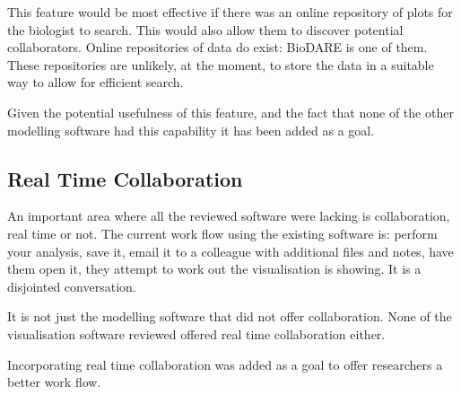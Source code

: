 This feature would be most effective if there was an online repository of plots for the biologist to search.  This would also allow them to discover potential collaborators.  Online repositories of data do exist: BioDARE is one of them.  These repositories are unlikely, at the moment, to store the data in a suitable way to allow for efficient search.

Given the potential usefulness of this feature, and the fact that none of the other modelling software had this capability it has been added as a goal.

\subsection{Real Time Collaboration}

An important area where all the reviewed software were lacking is collaboration, real time or not.  The current work flow using the existing software is: perform your analysis, save it, email it to a colleague with additional files and notes, have them open it, they attempt to work out the visualisation is showing.  It is a disjointed conversation.

It is not just the modelling software that did not offer collaboration. None of the visualisation software reviewed offered real time collaboration either.

Incorporating real time collaboration was added as a goal to offer researchers a better work flow.

